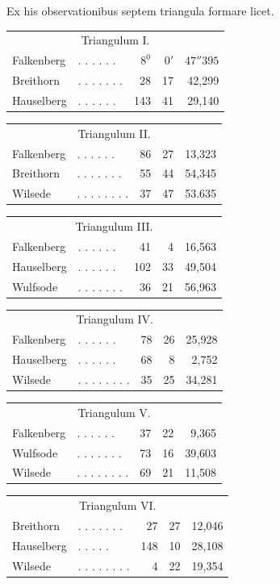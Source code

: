 Ex his observationibus septem triangula formare licet.
\begin{center}
\begin{tabular}{l l r r r}
\multicolumn{5}{c}{Triangulum I.}\\[5pt]
Falkenberg&. . . . . .&\(8^0\)&\(0'\)&\(47''395\)\\
Breithorn&. . . . . . .&28&17&42,299\\
Hauselberg&. . . . . .&143&41&29,140
\end{tabular}
\end{center}
\begin{center}
\begin{tabular}{l l r r r}
\multicolumn{5}{c}{Triangulum II.}\\[5pt]
Falkenberg&. . . . . .&86&27&13,323\\
Breithorn&. . . . . . .&55&44&54,345\\
Wilsede&. . . . . . . .&37&47&53.635
\end{tabular}
\end{center}
\begin{center}
\begin{tabular}{l l r r r}
\multicolumn{5}{c}{Triangulum III.}\\[5pt]
Falkenberg&. . . . . .&41&4&16,563\\
Hauselberg&. . . . . .&102&33&49,504\\
Wulfsode&. . . . . . .&36&21&56,963
\end{tabular}
\end{center}
\begin{center}
\begin{tabular}{l l r r r}
\multicolumn{5}{c}{Triangulum IV.}\\[5pt]
Falkenberg&. . . . . .&78&26&25,928\\
Hauselberg&. . . . . .&68&8&2,752\\
Wilsede&. . . . . . . .&35&25&34,281
\end{tabular}
\end{center}
\begin{center}
\begin{tabular}{l l r r r}
\multicolumn{5}{c}{Triangulum V.}\\[5pt]
Falkenberg&. . . . . .&37&22&9,365\\
Wulfsode&. . . . . . .&73&16&39,603\\
Wilsede&. . . . . . . .&69&21&11,508
\end{tabular}
\end{center}
\begin{center}
\begin{tabular}{l l r r r}
\multicolumn{5}{c}{Triangulum VI.}\\[5pt]
Breithorn&. . . . . . .&27&27&12,046\\
Hauselberg&. . . . \hspace{.5em} .&148&10&28,108\\
Wilsede&. . . . . . . .&4&22&19,354
\end{tabular}
\end{center}
